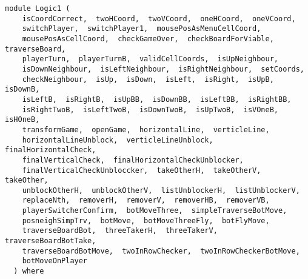 \label{module:Logic1}
\haddockbeginheader
{\haddockverb\begin{verbatim}
module Logic1 (
    isCoordCorrect,  twoHCoord,  twoVCoord,  oneHCoord,  oneVCoord, 
    switchPlayer,  switchPlayer1,  mousePosAsMenuCellCoord, 
    mousePosAsCellCoord,  checkGameOver,  checkBoardForViable,  traverseBoard, 
    playerTurn,  playerTurnB,  validCellCoords,  isUpNeighbour, 
    isDownNeighbour,  isLeftNeighbour,  isRightNeighbour,  setCoords, 
    checkNeighbour,  isUp,  isDown,  isLeft,  isRight,  isUpB,  isDownB, 
    isLeftB,  isRightB,  isUpBB,  isDownBB,  isLeftBB,  isRightBB, 
    isRightTwoB,  isLeftTwoB,  isDownTwoB,  isUpTwoB,  isVOneB,  isHOneB, 
    transformGame,  openGame,  horizontalLine,  verticleLine, 
    horizontalLineUnblock,  verticleLineUnblock,  finalHorizontalCheck, 
    finalVerticalCheck,  finalHorizontalCheckUnblocker, 
    finalVerticalCheckUnbloccker,  takeOtherH,  takeOtherV,  takeOther, 
    unblockOtherH,  unblockOtherV,  listUnblockerH,  listUnblockerV, 
    replaceNth,  removerH,  removerV,  removerHB,  removerVB, 
    playerSwitcherConfirm,  botMoveThree,  simpleTraverseBotMove, 
    posneighSimpTrv,  botMove,  botMoveThreeFly,  botFlyMove, 
    traverseBoardBot,  threeTakerH,  threeTakerV,  traverseBoardBotTake, 
    traverseBoardBotMove,  twoInRowChecker,  twoInRowCheckerBotMove, 
    botMoveOnPlayer
  ) where\end{verbatim}}
\haddockendheader

